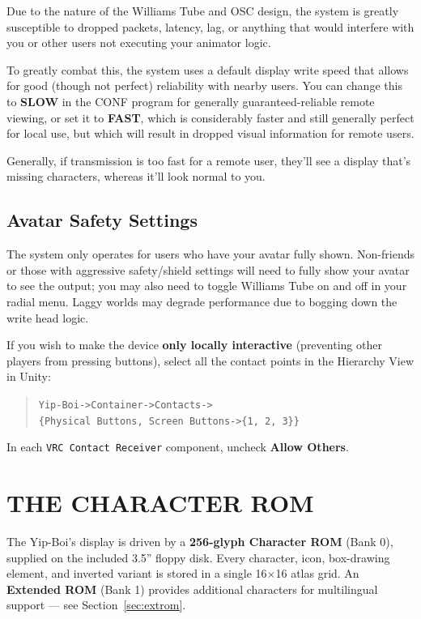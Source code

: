 \documentclass[10pt]{article}
\begin{document}
Due to the nature of the Williams Tube and OSC design, the system is greatly susceptible to dropped packets, latency, lag, or anything that would interfere with you or other users not executing your animator logic.

To greatly combat this, the system uses a default display write speed that allows for good (though not perfect) reliability with nearby users. You can change this to \textbf{SLOW} in the CONF program for generally guaranteed-reliable remote viewing, or set it to \textbf{FAST}, which is considerably faster and still generally perfect for local use, but which will result in dropped visual information for remote users.

Generally, if transmission is too fast for a remote user, they'll see a display that's missing characters, whereas it'll look normal to you.

\subsection{Avatar Safety Settings}

The system only operates for users who have your avatar fully shown. Non-friends or those with aggressive safety/shield settings will need to fully show your avatar to see the output; you may also need to toggle Williams Tube on and off in your radial menu. Laggy worlds may degrade performance due to bogging down the write head logic.

If you wish to make the device \textbf{only locally interactive} (preventing other players from pressing buttons), select all the contact points in the Hierarchy View in Unity:

\begin{quote}
\texttt{Yip-Boi->Container->Contacts->}\\
\texttt{\{Physical Buttons, Screen Buttons->\{1, 2, 3\}\}}
\end{quote}

\noindent In each \texttt{VRC Contact Receiver} component, uncheck \textbf{Allow Others}.

\newpage
\section{THE CHARACTER ROM}
\label{sec:charset}

The Yip-Boi's display is driven by a \textbf{256-glyph Character ROM} (Bank 0), supplied on the included 3.5'' floppy disk. Every character, icon, box-drawing element, and inverted variant is stored in a single 16$\times$16 atlas grid. An \textbf{Extended ROM} (Bank 1) provides additional characters for multilingual support --- see Section~\ref{sec:extrom}.
\end{document}
